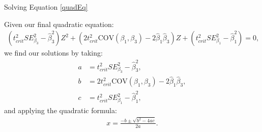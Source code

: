 \documentclass{beamer}\usepackage[]{graphicx}\usepackage[]{color}
\begin{document}
\begin{frame}{Solving Equation \ref{quadEq}}
  
  Given our final quadratic equation:
  \begin{align*}
    \left( t_{crit}^2 SE_{\beta_3}^2 - \hat{\beta}_3^2 \right) Z^2 +
    \left( 2t_{crit}^2 \text{COV}(\beta_1, \beta_3) - 2 \hat{\beta}_1 \hat{\beta}_3 \right) Z +
    \left( t_{crit}^2 SE_{\beta_1}^2 - \hat{\beta}_1^2 \right) = 0,
  \end{align*}
  we find our solutions by taking:
  \begin{align*}
    a &= t_{crit}^2 SE_{\beta_3}^2 - \hat{\beta}_3^2,\\[8pt]
    b &= 2t_{crit}^2 \text{COV}(\beta_1, \beta_3) - 2 \hat{\beta}_1 \hat{\beta}_3,\\[8pt]
    c &= t_{crit}^2 SE_{\beta_1}^2 - \hat{\beta}_1^2,
  \end{align*}
  and applying the quadratic formula:
  \begin{align*}
    x = \frac{-b \pm \sqrt{b^2 - 4ac}}{2a}.
  \end{align*}
  
\end{frame}
    
\watermarkoff %
\end{document}
